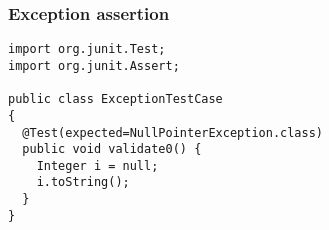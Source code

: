 \begin{frame}[fragile, hasprev=false, hasnext=false]
\frametitle{Exception assertion}
\label{example:junit-exception-assertion}

\begin{lstlisting}
import org.junit.Test;
import org.junit.Assert;

public class ExceptionTestCase
{
  @Test(expected=NullPointerException.class)
  public void validate0() {
    Integer i = null;
    i.toString();
  }
}
\end{lstlisting}
\end{frame}